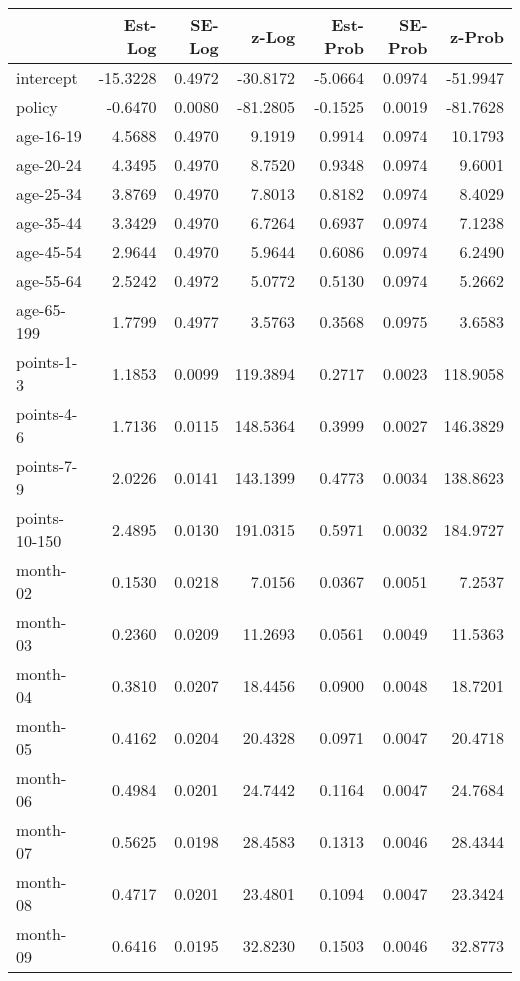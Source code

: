 \documentclass[10pt]{article}
\begin{document}
\begin{table}[ht]
\centering
\begin{tabular}{lrrrrrr}
  \hline
 & Est-Log & SE-Log & z-Log & Est-Prob & SE-Prob & z-Prob \\ 
  \hline
intercept & -15.3228 & 0.4972 & -30.8172 & -5.0664 & 0.0974 & -51.9947 \\ 
  policy & -0.6470 & 0.0080 & -81.2805 & -0.1525 & 0.0019 & -81.7628 \\ 
  age-16-19 & 4.5688 & 0.4970 & 9.1919 & 0.9914 & 0.0974 & 10.1793 \\ 
  age-20-24 & 4.3495 & 0.4970 & 8.7520 & 0.9348 & 0.0974 & 9.6001 \\ 
  age-25-34 & 3.8769 & 0.4970 & 7.8013 & 0.8182 & 0.0974 & 8.4029 \\ 
  age-35-44 & 3.3429 & 0.4970 & 6.7264 & 0.6937 & 0.0974 & 7.1238 \\ 
  age-45-54 & 2.9644 & 0.4970 & 5.9644 & 0.6086 & 0.0974 & 6.2490 \\ 
  age-55-64 & 2.5242 & 0.4972 & 5.0772 & 0.5130 & 0.0974 & 5.2662 \\ 
  age-65-199 & 1.7799 & 0.4977 & 3.5763 & 0.3568 & 0.0975 & 3.6583 \\ 
  points-1-3 & 1.1853 & 0.0099 & 119.3894 & 0.2717 & 0.0023 & 118.9058 \\ 
  points-4-6 & 1.7136 & 0.0115 & 148.5364 & 0.3999 & 0.0027 & 146.3829 \\ 
  points-7-9 & 2.0226 & 0.0141 & 143.1399 & 0.4773 & 0.0034 & 138.8623 \\ 
  points-10-150 & 2.4895 & 0.0130 & 191.0315 & 0.5971 & 0.0032 & 184.9727 \\ 
  month-02 & 0.1530 & 0.0218 & 7.0156 & 0.0367 & 0.0051 & 7.2537 \\ 
  month-03 & 0.2360 & 0.0209 & 11.2693 & 0.0561 & 0.0049 & 11.5363 \\ 
  month-04 & 0.3810 & 0.0207 & 18.4456 & 0.0900 & 0.0048 & 18.7201 \\ 
  month-05 & 0.4162 & 0.0204 & 20.4328 & 0.0971 & 0.0047 & 20.4718 \\ 
  month-06 & 0.4984 & 0.0201 & 24.7442 & 0.1164 & 0.0047 & 24.7684 \\ 
  month-07 & 0.5625 & 0.0198 & 28.4583 & 0.1313 & 0.0046 & 28.4344 \\ 
  month-08 & 0.4717 & 0.0201 & 23.4801 & 0.1094 & 0.0047 & 23.3424 \\ 
  month-09 & 0.6416 & 0.0195 & 32.8230 & 0.1503 & 0.0046 & 32.8773 \\ 

\end{tabular}
\end{table}
\end{document}
